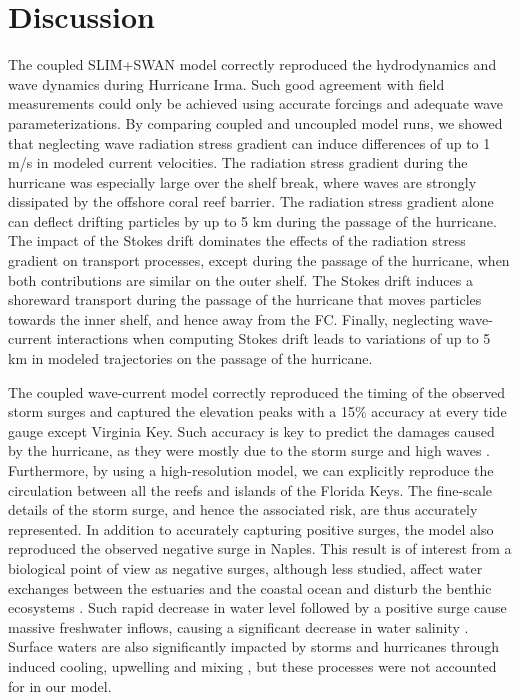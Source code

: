\section{Discussion}
The coupled SLIM+SWAN model correctly reproduced the hydrodynamics and wave dynamics during Hurricane Irma. Such good agreement with field measurements could only be achieved using accurate forcings and adequate wave parameterizations. By comparing coupled and uncoupled model runs, we showed that neglecting wave radiation stress gradient can induce differences of up to 1 m/s in modeled current velocities. The radiation stress gradient during the hurricane was especially large over the shelf break, where waves are strongly dissipated by the offshore coral reef barrier. The radiation stress gradient alone can deflect drifting particles by up to 5 km during the passage of the hurricane. The impact of the Stokes drift dominates the effects of the radiation stress gradient on transport processes, except during the passage of the hurricane, when both contributions are similar on the outer shelf. The Stokes drift induces a shoreward transport during the passage of the hurricane that moves particles towards  the inner shelf, and hence away from the FC. Finally, neglecting wave-current interactions when computing Stokes drift leads to variations of up to 5 km in modeled trajectories on the passage of the hurricane.

The coupled wave-current model correctly reproduced the timing of the observed storm surges and captured the elevation peaks with a 15\% accuracy at every tide gauge except Virginia Key. Such accuracy is key to predict the damages caused by the hurricane, as they were mostly due to the storm surge and  high waves \citep{xian2018brief}. Furthermore, by using a high-resolution model, we can explicitly reproduce the circulation between all the reefs and islands of the Florida Keys. The fine-scale details of the storm surge, and hence the associated risk, are thus accurately represented. In addition to accurately capturing positive surges, the model also reproduced the observed negative surge in Naples. This result is of interest from a biological point of view as negative surges, although less studied, affect water exchanges between the estuaries and the coastal ocean and disturb the benthic ecosystems \citep{liu2020impacts}. Such rapid decrease in water level followed by a positive surge cause massive freshwater inflows, causing a significant decrease in water salinity \citep{wachnicka2019hurricane}. Surface waters are also significantly impacted by storms and hurricanes through induced cooling, upwelling and mixing \citep{varlas2020investigating}, but these processes were not accounted for in our model.

